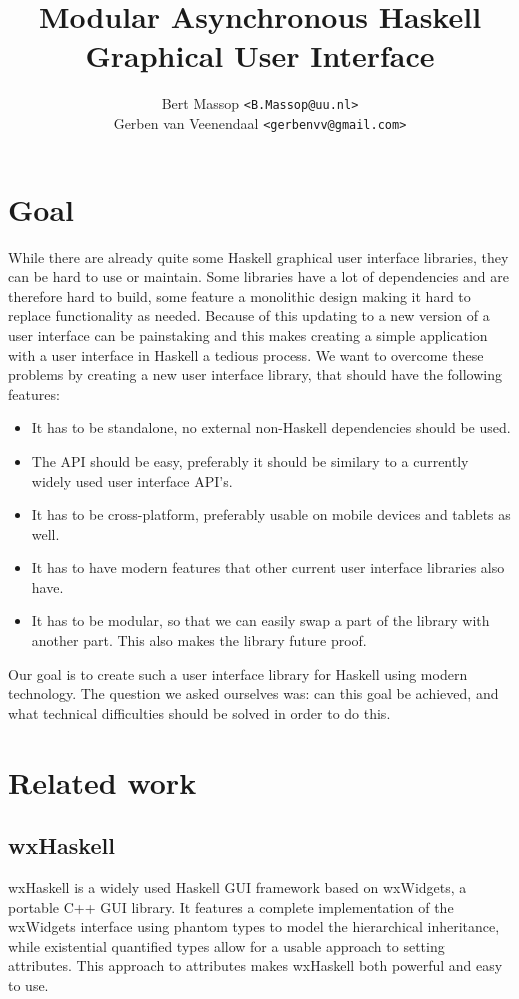 \documentclass[11pt,a4paper]{article}
\title{Modular Asynchronous Haskell Graphical User Interface}
\author{Bert Massop \texttt{<B.Massop@uu.nl>}\\
Gerben van Veenendaal \texttt{<gerbenvv@gmail.com>}}
\begin{document}
\maketitle

\newpage
\tableofcontents

\newpage
\section{Goal}

While there are already quite some Haskell graphical user interface libraries, they can be hard to use or maintain.
Some libraries have a lot of dependencies and are therefore hard to build, some feature a monolithic design making it hard to replace functionality as needed.
Because of this updating to a new version of a user interface can be painstaking and this makes creating a simple application with a user interface in Haskell a tedious process.
We want to overcome these problems by creating a new user interface library, that should have the following features:

\begin{itemize}
\item It has to be standalone, no external non-Haskell dependencies should be used.
\item The API should be easy, preferably it should be similary to a currently widely used user interface API's.
\item It has to be cross-platform, preferably usable on mobile devices and tablets as well.
\item It has to have modern features that other current user interface libraries also have.
\item It has to be modular, so that we can easily swap a part of the library with another part.
This also makes the library future proof.
\end{itemize}

Our goal is to create such a user interface library for Haskell using modern technology.
The question we asked ourselves was: can this goal be achieved, and what technical difficulties should be solved in order to do this.

\section{Related work}
\subsection{wxHaskell}
wxHaskell is a widely used Haskell GUI framework based on wxWidgets, a portable C++ GUI library.
It features a complete implementation of the wxWidgets interface using phantom types to model the hierarchical inheritance, while existential quantified types allow for a usable approach to setting attributes.\cite{leijen2004wxhaskell}
This approach to attributes makes wxHaskell both powerful and easy to use.
\end{document}
